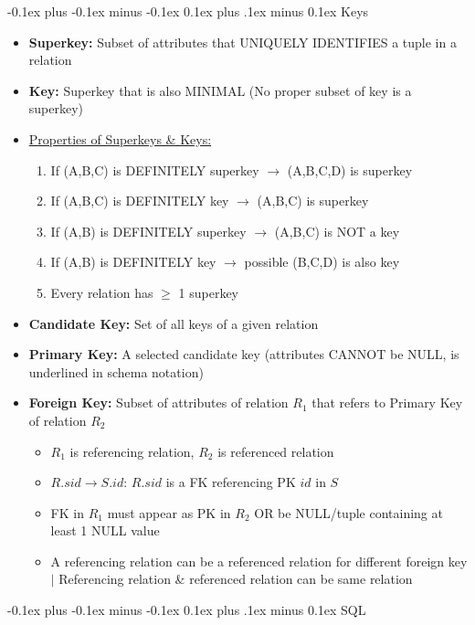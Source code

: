 \documentclass[landscape]{article}
\makeatletter
\renewcommand{\section}{\@startsection{section}{1}{0mm}%
  {-0.1ex plus -0.1ex minus -0.1ex}%
  {0.1ex plus .1ex minus 0.1ex}%
{\normalfont\small\bfseries}}
\renewcommand{\subsection}{\@startsection{subsection}{2}{0mm}%
  {-0.1ex plus -0.1ex minus -0.1ex}%
  {0.1ex plus .1ex minus 0.1ex}%
{\normalfont\scriptsize\bfseries}}
\makeatother
\begin{document}
\begin{multicols*}{5}
    \subsection{Keys}
    \begin{itemize}
      \item \textbf{Superkey:} Subset of attributes that UNIQUELY IDENTIFIES  a tuple in a relation
      \item \textbf{Key:} Superkey that is also MINIMAL (No proper subset of key is a superkey)
      \item \underline{Properties of Superkeys \& Keys:}
      \begin{enumerate}
        \item If (A,B,C) is DEFINITELY superkey $\rightarrow$ (A,B,C,D) is superkey
        \item If (A,B,C) is DEFINITELY key $\rightarrow$ (A,B,C) is superkey
        \item If (A,B) is DEFINITELY superkey $\rightarrow$ (A,B,C) is NOT a key
        \item If (A,B) is DEFINITELY key $\rightarrow$ possible (B,C,D) is also key
        \item Every relation has $\geq$ 1 superkey
      \end{enumerate}
      \item \textbf{Candidate Key:} Set of all keys of a given relation
      \item \textbf{Primary Key:} A selected candidate key (attributes CANNOT be NULL, is underlined in schema notation)
      \item \textbf{Foreign Key:} Subset of attributes of relation $R_1$ that refers to Primary Key of relation $R_2$
      \begin{itemize}
        \item $R_1$ is referencing relation, $R_2$ is referenced relation
        \item $R.sid \rightarrow S.id$: $R.sid$ is a FK referencing PK $id$ in $S$
        \item FK in $R_1$ must appear as PK in $R_2$ OR be NULL/tuple containing at least 1 NULL value
        \item A referencing relation can be a referenced relation for different foreign key $\vert$ Referencing relation \& referenced relation can be same relation
      \end{itemize}
    \end{itemize}

    \section{SQL}

\end{multicols*}
\end{document}
